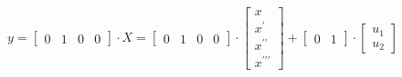 \documentclass{article}
\begin{document}
        $$y = 
        \begin{bmatrix}
            0 & 1 & 0 & 0
        \end{bmatrix} \cdot X = 
        \begin{bmatrix}
            0 & 1 & 0 & 0
        \end{bmatrix} \cdot
        \begin{bmatrix}
            x\\
            x^{\prime}\\
            x^{\prime\prime}\\
            x^{\prime\prime\prime}
        \end{bmatrix} + 
        \begin{bmatrix}
            0 & 1
        \end{bmatrix} \cdot
        \begin{bmatrix}
            u_1\\
            u_2
        \end{bmatrix}
        $$
                                        
                                        
     
     
\end{document}
